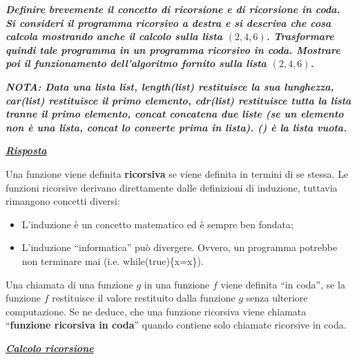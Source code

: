 \documentclass[a4paper]{article}
\newcommand{\dquotes}[1]{``#1''}
\begin{document}
	\textcolor{Red3}{\textbf{\emph{Definire brevemente il concetto di ricorsione e di ricorsione in coda. Si consideri il programma ricorsivo a destra e si descriva che cosa calcola mostrando anche il calcolo sulla lista $\left(2,4,6\right)$. Trasformare quindi tale programma in un programma ricorsivo in coda. Mostrare poi il funzionamento dell'algoritmo fornito sulla lista $\left(2,4,6\right)$.}}}\newline
	
	\noindent
	\textcolor{Red3}{\textbf{\emph{NOTA: Data una lista list, length(list) restituisce la sua lunghezza, car(list) restituisce il primo elemento, cdr(list) restituisce tutta la lista tranne il primo elemento, concat concatena due liste (se un elemento non è una lista, concat lo converte prima in lista). () è la lista vuota.}}}
	
	
	\noindent
	\textcolor{Green4}{\textbf{\emph{\underline{Risposta}}}}\newline
	
	\noindent
	Una funzione viene definita \textbf{ricorsiva} se viene definita in termini di se stessa. Le funzioni ricorsive derivano direttamente dalle definizioni di induzione, tuttavia rimangono concetti diversi:
	\begin{itemize}
		\item L'induzione è un concetto matematico ed è sempre ben fondata;
		
		\item L'induzione \dquotes{informatica} può divergere. Ovvero, un programma potrebbe non terminare mai (i.e. \textsf{while(true)\{x=x\}}).
	\end{itemize}
	Una chiamata di una funzione $g$ in una funzione $f$ viene definita \dquotes{in coda}, se la funzione $f$ restituisce il valore restituito dalla funzione $g$ senza ulteriore computazione. Se ne deduce, che una funzione ricorsiva viene chiamata \dquotes{\textbf{funzione ricorsiva in coda}} quando contiene solo chiamate ricorsive in coda.
	
	\begin{center}
		\textbf{\emph{\underline{Calcolo ricorsione}}}
	\end{center}
	
\end{document}

